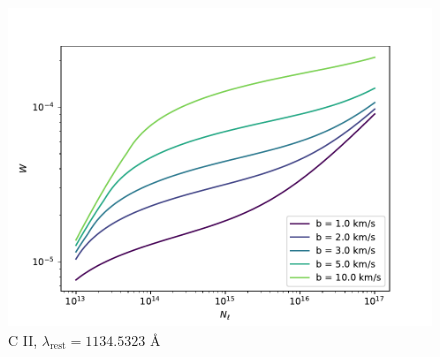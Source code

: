 \documentclass[12pt,letterpaper]{article}
\newcommand{\lambdarest}{\lambda_{\textrm{rest}}}
\begin{document}
\begin{figure}[H]
    \centering
    \includegraphics[width=0.75\columnwidth]{images/W_N_C_II.pdf}
    \caption{C II, $\lambdarest = 1134.5323$ \AA}
\end{figure}
\end{document}
